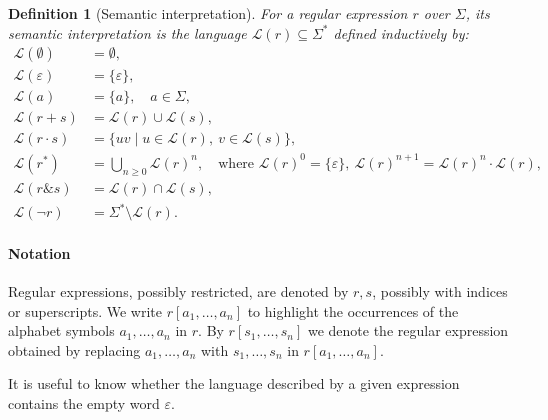 \documentclass{article}
\newtheorem{definition}{Definition}[section]
\begin{document}
\begin{definition}[Semantic interpretation]

For a regular expression $r$ over $\Sigma$, its semantic interpretation is the
language $\mathcal{L}(r) \subseteq \Sigma^*$ defined inductively by:
\[
\begin{aligned}
\mathcal{L}(\emptyset)   &= \emptyset, \\
\mathcal{L}(\varepsilon) &= \{\varepsilon\}, \\
\mathcal{L}(a)           &= \{a\}, \quad a \in \Sigma, \\[0.5ex]
\mathcal{L}(r + s)       &= \mathcal{L}(r) \cup \mathcal{L}(s), \\
\mathcal{L}(r \cdot s)   &= \{uv \mid u \in \mathcal{L}(r),\ v \in \mathcal{L}(s)\}, \\
\mathcal{L}(r^*)         &= \bigcup_{n \geq 0} \mathcal{L}(r)^n,
   \quad \text{where } \mathcal{L}(r)^0 = \{\varepsilon\},\
   \mathcal{L}(r)^{n+1} = \mathcal{L}(r)^n \cdot \mathcal{L}(r), \\
\mathcal{L}(r \& s)      &= \mathcal{L}(r) \cap \mathcal{L}(s), \\
\mathcal{L}(\neg r)      &= \Sigma^* \setminus \mathcal{L}(r).
\end{aligned}
\]
\end{definition}
\paragraph{Notation} Regular expressions, possibly restricted, are denoted by $r,s$, possibly with indices or superscripts. We write $r[a_1,\ldots,a_n]$ to highlight the occurrences of the alphabet symbols $a_1,\ldots,a_n$ in $r$. By $r[s_1,\ldots,s_n]$ we denote the regular expression obtained by replacing $a_1,\ldots,a_n$ with $s_1,\ldots,s_n$ in $r[a_1,\ldots,a_n]$.


It is useful to know whether the language described by a given expression contains the empty word $\varepsilon$.
\end{document}
